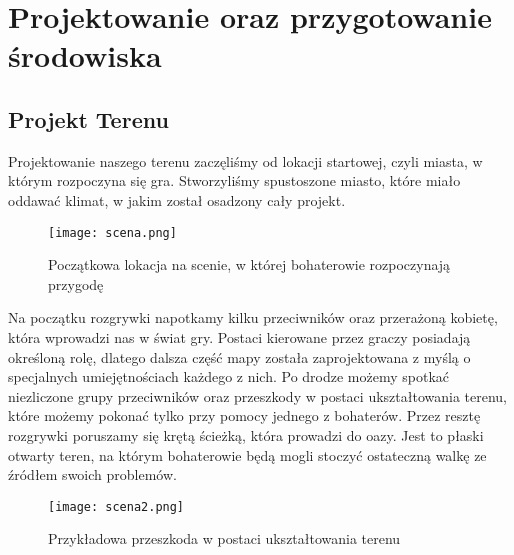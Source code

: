 \section{Projektowanie oraz przygotowanie środowiska}
\subsection{Projekt Terenu}
Projektowanie naszego terenu zaczęliśmy od lokacji startowej, czyli miasta, w którym rozpoczyna się gra. 
Stworzyliśmy spustoszone miasto, które miało oddawać klimat, w jakim został osadzony cały projekt. 
\begin{figure}[H]
	\center
	\texttt{[image: scena.png]}
	\caption{Początkowa lokacja na scenie, w której bohaterowie rozpoczynają przygodę}
\end{figure}
Na początku rozgrywki napotkamy kilku przeciwników oraz przerażoną kobietę, która wprowadzi nas w świat gry.  
Postaci kierowane przez graczy posiadają określoną rolę, dlatego dalsza część mapy została zaprojektowana z myślą o specjalnych umiejętnościach każdego z nich.
Po drodze możemy spotkać niezliczone grupy przeciwników oraz przeszkody w postaci ukształtowania terenu, które możemy pokonać tylko przy pomocy jednego z bohaterów.
Przez resztę rozgrywki poruszamy się krętą ścieżką, która prowadzi do oazy.
Jest to płaski otwarty teren, na którym bohaterowie będą mogli stoczyć ostateczną walkę ze źródłem swoich problemów.
\begin{figure}[H]
	\center
	\texttt{[image: scena2.png]}
	\caption{Przykładowa przeszkoda w postaci ukształtowania terenu}
\end{figure}